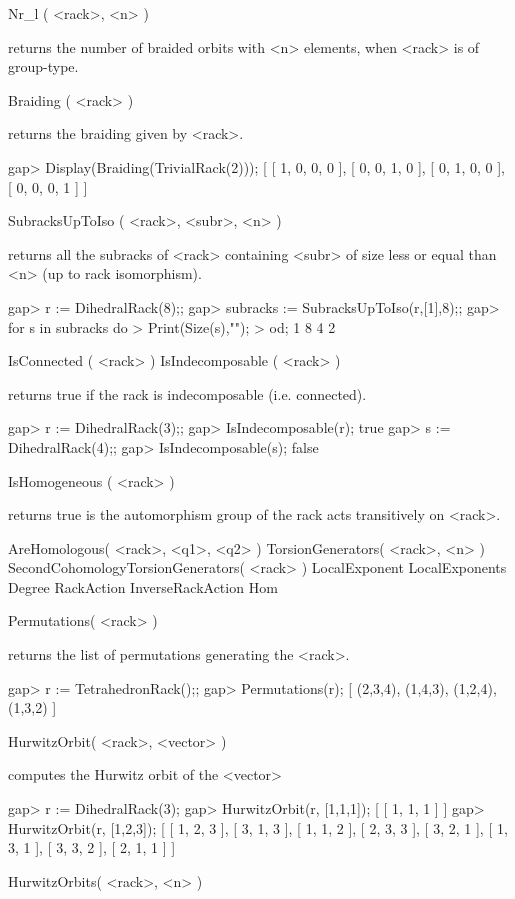 \>Nr_l ( <rack>, <n> )

returns the number of braided orbits with <n> elements, when <rack> is of
group-type.

\>Braiding ( <rack> )

returns the braiding given by <rack>.

\beginexample
gap> Display(Braiding(TrivialRack(2)));  
[ [  1,  0,  0,  0 ],
  [  0,  0,  1,  0 ],
  [  0,  1,  0,  0 ],
  [  0,  0,  0,  1 ] ]
\endexample

\>SubracksUpToIso ( <rack>, <subr>, <n> )

returns all the subracks of <rack> containing <subr> of size less or equal than
<n> (up to rack isomorphism).

\beginexample
gap> r := DihedralRack(8);;
gap> subracks := SubracksUpToIso(r,[1],8);;
gap> for s in subracks do
> Print(Size(s),"\n");
> od;
1
8
4
2
\endexample

\>IsConnected ( <rack> )
\>IsIndecomposable ( <rack> )

returns true if the rack is indecomposable (i.e. connected).

\beginexample
gap> r := DihedralRack(3);;
gap> IsIndecomposable(r);
true
gap> s := DihedralRack(4);;
gap> IsIndecomposable(s);
false
\endexample

\>IsHomogeneous ( <rack> )

returns true is the automorphism group of the rack acts transitively on <rack>.

\>AreHomologous( <rack>, <q1>, <q2> )
\>TorsionGenerators( <rack>, <n> )
\>SecondCohomologyTorsionGenerators( <rack> )
\>LocalExponent
\>LocalExponents
\>Degree
\>RackAction
\>InverseRackAction
\>Hom

\>Permutations( <rack> )

returns the list of permutations generating the <rack>.

\beginexample
gap> r := TetrahedronRack();;
gap> Permutations(r);
[ (2,3,4), (1,4,3), (1,2,4), (1,3,2) ]
\endexample

\>HurwitzOrbit( <rack>, <vector> )

computes the Hurwitz orbit of the <vector>

\beginexample
gap> r := DihedralRack(3);   
gap> HurwitzOrbit(r, [1,1,1]); 
[ [ 1, 1, 1 ] ]
gap> HurwitzOrbit(r, [1,2,3]);
[ [ 1, 2, 3 ], [ 3, 1, 3 ], [ 1, 1, 2 ], [ 2, 3, 3 ], [ 3, 2, 1 ], [ 1, 3, 1 ], [ 3, 3, 2 ], [ 2, 1, 1 ] ]
\endexample 

\>HurwitzOrbits( <rack>, <n> )

